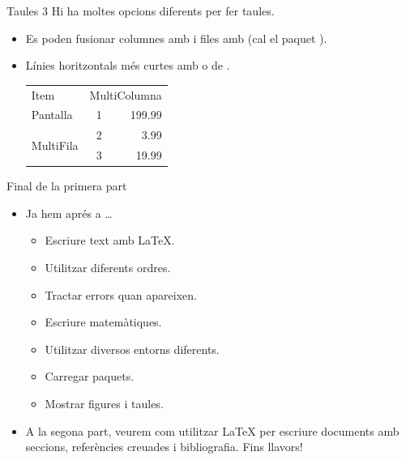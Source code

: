 \begin{frame}[fragile]{Taules 3}
Hi ha moltes opcions diferents per fer taules.
\begin{itemize}
\item Es poden fusionar columnes amb  i files amb  (cal el paquet ).
\item Línies horitzontals més curtes amb  o  de .

\begin{exampletwouptiny}
\begin{tabular}{lrr}
\toprule
Item &
\multicolumn{2}{c}{MultiColumna} \\
\cline{2-3}
Pantalla  & 1   & 199.99  \\
\cmidrule{1-2}
\multirow{2}{*}{MultiFila} & 2 & 3.99\\
& 3   & 19.99   \\
\bottomrule
\end{tabular}
\end{exampletwouptiny}
\end{itemize}
\end{frame}


\begin{frame}{Final de la primera part}
\begin{itemize}
\item Ja hem aprés a \dots
\begin{itemize}
\item Escriure text amb \LaTeX.
\item Utilitzar diferents ordres.
\item Tractar errors quan apareixen.
\item Escriure matemàtiques.
\item Utilitzar diversos entorns diferents.
\item Carregar paquets.
\item Mostrar figures i taules.
\end{itemize}
\item A la segona part, veurem com utilitzar \LaTeX{} per escriure documents amb seccions, referències creuades i bibliografia. Fins llavors!
\end{itemize}
\end{frame}

